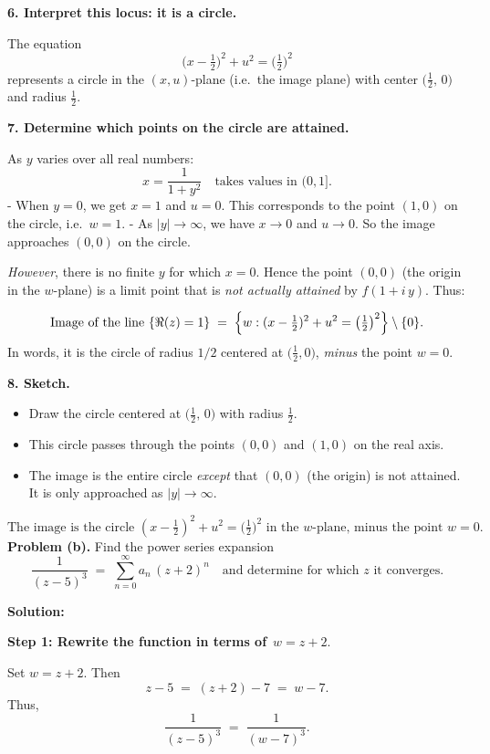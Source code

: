 \documentclass[12pt]{article}
\theoremstyle{definition} %
\theoremstyle{plain} %
\begin{document}
\textbf{6. Interpret this locus: it is a circle.}

The equation
\[
\bigl(x - \tfrac{1}{2}\bigr)^2 + u^2 = \bigl(\tfrac{1}{2}\bigr)^2
\]
represents a circle in the \((x,u)\)-plane (i.e.\ the image plane) with center 
\(\bigl(\tfrac{1}{2},\,0\bigr)\) and radius \(\tfrac{1}{2}\).

\textbf{7. Determine which points on the circle are attained.}

As \(y\) varies over all real numbers:
\[
x = \frac{1}{1 + y^2} \quad \text{takes values in } (0,1].
\]
- When \(y = 0\), we get \(x = 1\) and \(u = 0\). This corresponds to the point \((1,0)\) on the circle, i.e.\ \(w = 1\).
- As \(|y|\to \infty\), we have \(x \to 0\) and \(u \to 0\). So the image approaches \((0,0)\) on the circle. 

\emph{However}, there is no finite \(y\) for which \(x = 0\). Hence the point \((0,0)\) (the origin in the \(w\)-plane) is a limit point that is \emph{not actually attained} by \(f(1 + i\,y)\). Thus:

\[
\text{Image of the line } \{ \Re(z) = 1 \}
\;=\;
\Bigl\{
w : (x - \tfrac{1}{2})^2 + u^2 = \bigl(\tfrac{1}{2}\bigr)^2
\Bigr\}
\setminus
\{0\}.
\]
In words, it is the circle of radius \(1/2\) centered at \(\bigl(\tfrac{1}{2},0\bigr)\), \emph{minus} the point \(w = 0\). 

\textbf{8. Sketch.}

\begin{itemize}
\item Draw the circle centered at \(\bigl(\tfrac{1}{2},\,0\bigr)\) with radius \(\tfrac{1}{2}\). 
\item This circle passes through the points \((0,0)\) and \((1,0)\) on the real axis.
\item The image is the entire circle \emph{except} that \((0,0)\) (the origin) is not attained. It is only approached as \(|y|\to\infty\).
\end{itemize}

\[
\boxed{
\text{The image is the circle } (x-\tfrac{1}{2})^2 + u^2 = \bigl(\tfrac{1}{2}\bigr)^2 \text{ in the } w\text{-plane, minus the point } w=0.
}
\]
\textbf{Problem (b).} Find the power series expansion
\[
\frac{1}{(z - 5)^3}
\;=\;
\sum_{n=0}^{\infty} a_n \,(z+2)^n
\quad
\text{and determine for which } z \text{ it converges.}
\]

\textbf{Solution:}

\textbf{Step 1: Rewrite the function in terms of } \(\,w = z + 2.\)

Set \(w = z + 2\). Then
\[
z - 5 \;=\; (z + 2) - 7 \;=\; w - 7.
\]
Thus,
\[
\frac{1}{(z - 5)^3}
\;=\;
\frac{1}{(w - 7)^3}.
\]
\end{document}
